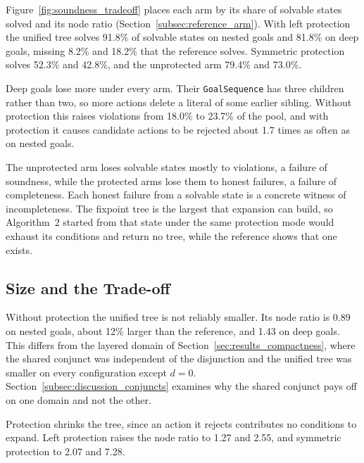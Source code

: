     Figure~\ref{fig:soundness_tradeoff} places each arm by its share of solvable states solved and its node ratio (Section~\ref{subsec:reference_arm}).
    With left protection the unified tree solves 91.8\% of solvable states on nested goals and 81.8\% on deep goals, missing 8.2\% and 18.2\% that the reference solves.
    Symmetric protection solves 52.3\% and 42.8\%, and the unprotected arm 79.4\% and 73.0\%.

    

    Deep goals lose more under every arm.
    Their \texttt{GoalSequence} has three children rather than two, so more actions delete a literal of some earlier sibling.
    Without protection this raises violations from 18.0\% to 23.7\% of the pool, and with protection it causes candidate actions to be rejected about 1.7 times as often as on nested goals.

    The unprotected arm loses solvable states mostly to violations, a failure of soundness, while the protected arms lose them to honest failures, a failure of completeness.
    Each honest failure from a solvable state is a concrete witness of incompleteness.
    The fixpoint tree is the largest that expansion can build, so Algorithm~2 started from that state under the same protection mode would exhaust its conditions and return no tree, while the reference shows that one exists.

    \subsection{Size and the Trade-off}
    \label{subsec:interference_tradeoff}
    Without protection the unified tree is not reliably smaller.
    Its node ratio is 0.89 on nested goals, about 12\% larger than the reference, and 1.43 on deep goals.
    This differs from the layered domain of Section~\ref{sec:results_compactness}, where the shared conjunct was independent of the disjunction and the unified tree was smaller on every configuration except $d = 0$.
    Section~\ref{subsec:discussion_conjuncts} examines why the shared conjunct pays off on one domain and not the other.

    Protection shrinks the tree, since an action it rejects contributes no conditions to expand.
    Left protection raises the node ratio to 1.27 and 2.55, and symmetric protection to 2.07 and 7.28.


